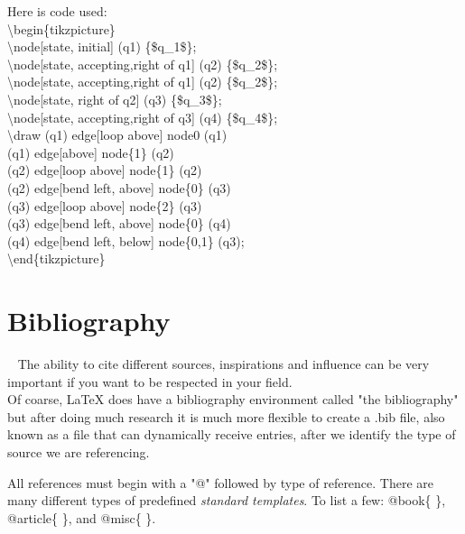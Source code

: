 Here is code used:  \\
\textbackslash{begin}\{tikzpicture\} \\
    \textbackslash{node}[state, initial] (q1) \{\$q_1\$\}; \\
    \textbackslash{node}[state, accepting,right of q1] (q2) \{\$q_2\$\}; \\
    \textbackslash{node}[state, accepting,right of q1] (q2) \{\$q_2\$\}; \\
    \textbackslash{node}[state, right of q2] (q3) \{\$q_3\$\}; \\
    \textbackslash{node}[state, accepting,right of q3] (q4) \{\$q_4\$\}; \\
    \textbackslash{draw}   (q1) edge[loop above] node{0} (q1) \\
                           (q1) edge[above] node\{1\} (q2) \\
                           (q2) edge[loop above] node\{1\} (q2) \\
                           (q2) edge[bend left, above] node\{0\}  (q3) \\
                           (q3) edge[loop above] node\{2\} (q3) \\
                           (q3) edge[bend left, above] node\{0\}  (q4) \\
                           (q4) edge[bend left, below] node\{0,1\} (q3); \\
\textbackslash{end}\{tikzpicture\}  \\


\section{Bibliography} ~\cite{tugorg}
The ability to cite different sources, inspirations and influence can
be very important if you want to be respected in your field. \\

Of coarse, \LaTeX{} does have a bibliography environment 
called "the bibliography" but after doing much research it
is much more flexible to create a .bib file, also known as
a \BibTex{} file that can dynamically receive entries, after
we identify the type of source we are referencing. 
~\cite{wiki_title_maker}

All references must begin with a "@" followed by type of reference.
There are many different types of predefined \textit{standard templates}.
To list a few: @book\{ \}, @article\{ \}, and @misc\{ \}. \\

